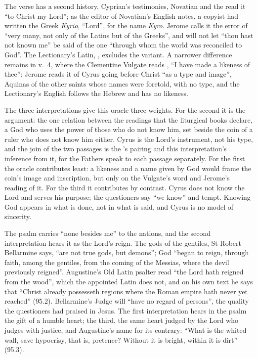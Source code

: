 The verse has a second history. Cyprian's testimonies, Novatian and the
 read it ``to Christ my Lord''; as the editor of
Novatian's English notes, a copyist had written the Greek \textit{Kyri\=o},
``Lord'', for the name \textit{Kyr\=o}.
Jerome calls it the error of ``very many, not only of the Latins but of the
Greeks'', and will not let ``thou hast not known me'' be said of the one
``through whom the world was reconciled to God''. The Lectionary's Latin,
, excludes the variant. A narrower difference remains
in v.~4, where the Clementine Vulgate reads , ``I have made
a likeness of thee'': Jerome reads it of Cyrus going before Christ ``as a type
and image'', Aquinas of the other saints whose names were foretold, with no
type, and the Lectionary's English follows the Hebrew and has no likeness.

The three interpretations give this oracle three weights. For the second it is
the argument: the one relation between the readings that the liturgical books
declare, a God who uses the power of those who do not know him, set beside the
coin of a ruler who does not know him either. Cyrus is the Lord's instrument,
not his type, and the join of the two passages is the 's pairing and
this interpretation's inference from it, for the Fathers speak to each passage
separately. For the first the oracle contributes least: a likeness and a name
given by God would frame the coin's image and inscription, but only on the
Vulgate's word and Jerome's reading of it. For the third it contributes by
contrast. Cyrus does not know the Lord and serves his purpose; the questioners
say ``we know'' and tempt. Knowing God appears in what is done, not in what is
said, and Cyrus is no model of sincerity.

The psalm carries ``none besides me'' to the nations, and the second
interpretation hears it as the Lord's reign. The gods of the gentiles, St Robert
Bellarmine says, ``are not true gods, but demons''; God ``began to reign,
through faith, among the gentiles, from the coming of the Messias, where the
devil previously reigned''. Augustine's Old Latin psalter read ``the Lord hath
reigned from the wood'', which the appointed Latin does not, and on his own
text he says that ``Christ already possesseth regions where the Roman empire
hath never yet reached'' (95.2). Bellarmine's Judge will ``have no regard of
persons'', the quality the questioners had praised in Jesus. The first
interpretation hears in the psalm the gift of a humble heart; the third, the
same heart judged by the Lord who judges with justice, and Augustine's name
for its contrary: ``What is the whited wall, save hypocrisy, that is,
pretence? Without it is bright, within it is dirt'' (95.3).

